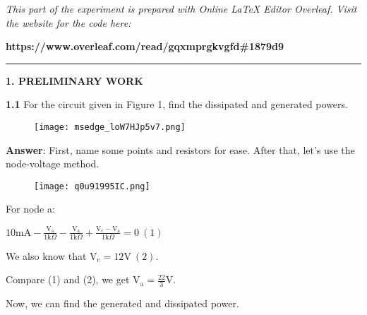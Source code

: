 \documentclass{article}
\begin{document}
\large

{\textit{This part of the experiment is prepared with Online LaTeX Editor Overleaf. Visit the website for the code here:}}

{\textbf{https://www.overleaf.com/read/gqxmprgkvgfd\#1879d9}}
\vspace{4mm}
\hrule
\vspace{4mm}
{\Large \textbf{1. PRELIMINARY WORK}}

\vspace{4mm}

{\textbf{1.1} For the circuit given in Figure 1, find the dissipated and generated powers.}

\vspace{4mm}

\begin{figure}[H]
    \centering
    \texttt{[image: msedge\_loW7HJp5v7.png]}
\end{figure}

\vspace{4mm}

{\textbf{Answer}: First, name some points and resistors for ease. After that, let's use the node-voltage method.}

\vspace{4mm}

\begin{figure}[H]
    \centering
    \texttt{[image: q0u91995IC.png]}
\end{figure}

\vspace{4mm}

{For node a:}

\vspace{4mm}

{$\displaystyle 10\text{mA}-\frac{\text{V}_{\text{a}}}{1\text{k}\Omega}-\frac{\text{V}_{\text{a}}}{1\text{k}\Omega} + \frac{\text{V}_{\text{c}}-\text{V}_{\text{a}}}{1\text{k}\Omega} = 0 \ (1)$}

\vspace{8mm}

{We also know that $\text{V}_\text{c} = 12\text{V} \ (2).$}

\vspace{4mm}

{Compare (1) and (2), we get $\displaystyle \text{V}_\text{a} = \frac{22}{3}\text{V}$.}

\vspace{4mm}

{Now, we can find the generated and dissipated power.}
\end{document}
